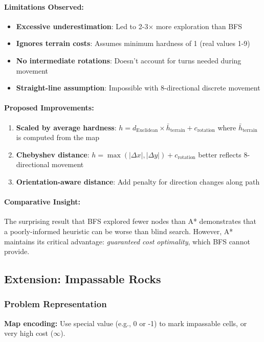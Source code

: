 \documentclass[11pt,a4paper]{article}
\begin{document}
\paragraph{Limitations Observed:}
\begin{itemize}[leftmargin=1.5cm,itemsep=0.1em]
    \item \textbf{Excessive underestimation}: Led to 2-3× more exploration than BFS
    \item \textbf{Ignores terrain costs}: Assumes minimum hardness of 1 (real values 1-9)
    \item \textbf{No intermediate rotations}: Doesn't account for turns needed during movement
    \item \textbf{Straight-line assumption}: Impossible with 8-directional discrete movement
\end{itemize}

\paragraph{Proposed Improvements:}
\begin{enumerate}[leftmargin=1.5cm,itemsep=0.1em]
    \item \textbf{Scaled by average hardness}: $h = d_{\text{Euclidean}} \times \bar{h}_{\text{terrain}} + c_{\text{rotation}}$ where $\bar{h}_{\text{terrain}}$ is computed from the map
    \item \textbf{Chebyshev distance}: $h = \max(|\Delta x|, |\Delta y|) + c_{\text{rotation}}$ better reflects 8-directional movement
    \item \textbf{Orientation-aware distance}: Add penalty for direction changes along path
\end{enumerate}

\paragraph{Comparative Insight:}
The surprising result that BFS explored fewer nodes than A* demonstrates that a poorly-informed heuristic can be worse than blind search. However, A* maintains its critical advantage: \textit{guaranteed cost optimality}, which BFS cannot provide.

\subsection{Extension: Impassable Rocks}

\subsubsection{Problem Representation}
\textbf{Map encoding:} Use special value (e.g., 0 or -1) to mark impassable cells, or very high cost ($\infty$).
\end{document}
